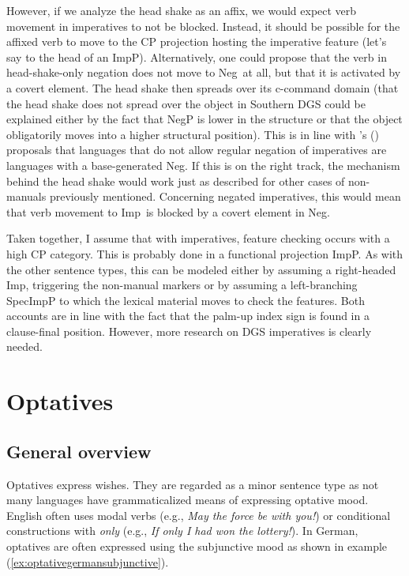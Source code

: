\noindent However, if we analyze the head shake as an affix, we would expect verb movement in imperatives to not be blocked. Instead, it should be possible for the affixed verb to move to the CP projection hosting the imperative feature (let's say to the head of an ImpP). Alternatively, one could propose that the verb in head-shake-only negation does not move to Neg\textdegree\ at all, but that it is activated by a covert element. The head shake then spreads over its c-command domain (that the head shake does not spread over the object in Southern DGS could be explained either by the fact that NegP is lower in the structure or that the object obligatorily moves into a higher structural position). This is in line with \citeauthor{zeijlstra2004sentential}'s (\citeyear{zeijlstra2004sentential}) proposals that languages that do not allow regular negation of imperatives are languages with a base-generated Neg\textdegree . If this is on the right track, the mechanism behind the head shake would work just as described for other cases of non-manuals previously mentioned. Concerning negated imperatives, this would mean that verb movement to Imp\textdegree\ is blocked by a covert element in Neg\textdegree . 


Taken together, I assume that with imperatives, feature checking occurs with a high CP category. This is probably done in a functional projection ImpP. As with the other sentence types, this can be modeled either by assuming a right-headed Imp\textdegree , triggering the non-manual markers or by assuming a left-branching SpecImpP to which the lexical material moves to check the features. Both accounts are in line with the fact that the palm-up index sign is found in a clause-final position. However, more research on DGS imperatives is clearly needed.



\section{Optatives}\label{opt}
\subsection{General overview}
Optatives express wishes. They are regarded as a minor sentence type as not many languages have grammaticalized means of expressing optative mood. English often uses modal verbs (e.g., \textit{May the force be with you!}) or conditional constructions with \textit{only} (e.g., \textit{If only I had won the lottery!}). In German, optatives are often expressed using the subjunctive mood as shown in example (\ref{ex:optativegermansubjunctive}). 


